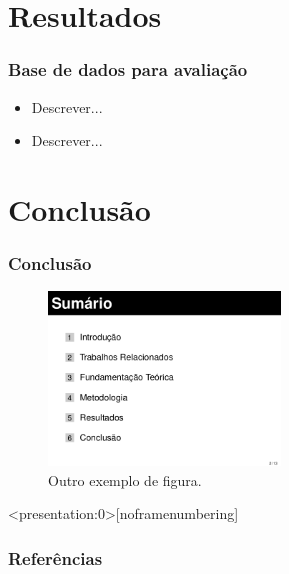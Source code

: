 \documentclass[aspectratio=34, 14pt]{latex-slides}
\begin{document}
    \section{Resultados}
    \begin{frame}
        \frametitle{Base de dados para avaliação}

        \begin{itemize}
            \item Descrever...
            \item Descrever...
        \end{itemize}
    \end{frame}

    \section{Conclusão}
    \begin{frame}
        \frametitle{Conclusão}

        \setcounter{figure}{3}
        \begin{figure}[!t]
            \centering
            \includegraphics[width=0.55\textwidth]{./figs/figura-exemplo2}
            \caption{Outro exemplo de figura.}
            \label{fig:outro_exemplo_figura}
        \end{figure}
    \end{frame}

    \begin{frame}<presentation:0>[noframenumbering] %
        \frametitle{Referências}

        \small
        
    \end{frame}

    \begin{frame}
        \titlepage
    \end{frame}
\end{document}
